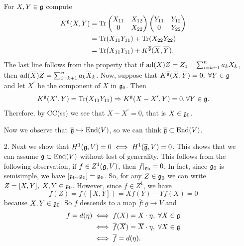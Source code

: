\begin{itemize}
    For $X,Y\in\fr{g}$ compute 
    \begin{equation}
        \begin{split}
            K^{\fr{g}}(X,Y)&=\Tr  
        \begin{pmatrix}
            X_{11}&X_{12}\\0&X_{22}
        \end{pmatrix}
        \begin{pmatrix}
            Y_{11}&Y_{12}\\0&Y_{22}
        \end{pmatrix}\\
        &=\Tr (X_{11}Y_{11})+\Tr (X_{22}Y_{22})\\
        &=\Tr (X_{11}Y_{11})+K^{\overline{\fr{g}}}(\overline{X},\overline{Y}).
        \end{split}
    \end{equation}
    The last line follows from the property that if $\ad(X)Z=Z_0+\sum_{i=k+1}^na_kX_k$, then 
$\ad(\overline{X})\overline{Z}=\sum_{i=k+1}^na_k\overline{X}_k$. 
Now, suppose that $K^{\overline{\fr{g}}}(\overline{X},\overline{Y})=0,\;\forall Y\in\fr{g}$ and let 
$X^\prime$ be the component of $X$ in $\fr{g}_0$. Then 
\begin{equation}
    K^{\fr{g}}(X^\prime,Y)=\Tr(X_{11}Y_{11})\Rightarrow K^{\fr{g}}(X-X^\prime,Y)=0,\forall Y\in\fr{g}.
\end{equation} 
Therefore, by CC(ss) we see that $X-X^\prime=0$, that is $X\in\fr{g}_0$.\par 
Now we observe that $\overline{\fr{g}}\hookrightarrow\End(V)$, so we can think $\overline{\fr{g}}\subset \End(V)$.
\item[2.] Next we show that $H^1(\mathfrak{g},V)=0\iff H^1(\overline{\mathfrak{g}},V)=0$. This shows that we can assume 
$\mathfrak{g}\subset\text{End}(V)$ without lost of generality. This follows from the following observation, if 
$f\in Z^1(\mathfrak{g},V)$, then $f|_{\mathfrak{g}_0}=0$. In fact, since $\fr{g}_0$ is semisimple, we have 
$[\mathfrak{g}_0,\mathfrak{g}_0]=\mathfrak{g}_0$. So, for any $Z\in\mathfrak{g}_0$ we can write $Z=[X,Y],\;X,Y\in\mathfrak{g}_0$. However, since 
$f\in Z^1$, we have 
\begin{equation}
   f(Z)= f([X,Y])=Xf(Y)-Yf(X) = 0
\end{equation}
because $X,Y\in\mathfrak{g}_0$. So $f$ descends to a map $\overline{f}:\overline{g}\to V$ and 
\begin{equation}
    \begin{split}
        f = d(\eta)&\iff f(X)=X\cdot\eta,\;\forall X\in\mathfrak{g}\\
        &\iff \overline{f}(\overline{X})=\overline{X}\cdot\eta,\;\forall X\in\mathfrak{g}\\
        &\iff \overline{f}=d(\eta).
    \end{split}
\end{equation}


\end{itemize}
